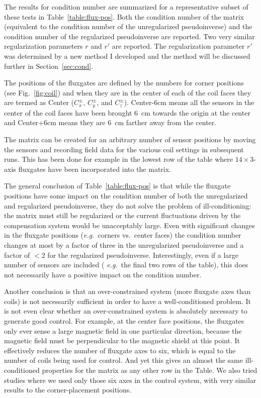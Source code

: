 The results for condition number are summarized for a representative
subset of these tests in Table~\ref{table:flux-pos}.  Both the
condition number of the matrix (equivalent to the condition number of
the unregularized pseudoinverse) and the condition number of the
regularized pseudoinverse are reported.  Two very similar
regularization parameters $r$ and $r'$ are reported.  The
regularization parameter $r'$ was determined by a new method I
developed and the method will be discussed further in
Section~\ref{sec:cond}.

The positions of the fluxgates are defined by the numbers for corner
positions (see Fig.~\ref{fig:coil}) and when they are in the center of
each of the coil faces they are termed as Center ($C_x^\pm$, $C_y^\pm$, and
$C_z^\pm$). Center-6cm means all the sensors in the center of the coil
faces have been brought 6~cm towards the origin at the center and
Center+6cm means they are 6~cm farther away from the center.

The matrix can be created for an arbitrary number of sensor positions
by moving the sensors and recording field data for the various coil
settings in subsequent runs.  This has been done for example in the
lowest row of the table where $14\times 3$-axis fluxgates have been
incorporated into the matrix.

The general conclusion of Table~\ref{table:flux-pos} is that while the
fluxgate positions have some impact on the condition number of both
the unregularized and regularized pseudoinverse, they do not solve the
problem of ill-conditioning: the matrix must still be regularized or
the current fluctuations driven by the compensation system would be
unacceptably large.  Even with significant changes in the fluxgate
positions ({\it e.g.}~corners vs.~center faces) the condition number
changes at most by a factor of three in the unregularized
pseudoinverse and a factor of $<2$ for the regularized pseudoinverse.
Interestingly, even if a large number of sensors are included ({\it
e.g.}~the final two rows of the table), this does not necessarily have
a positive impact on the condition number.

Another conclusion is that an over-constrained system (more fluxgate
axes than coils) is not necessarily sufficient in order to have a
well-conditioned problem.  It is not even clear whether an
over-constrained system is absolutely necessary to generate good
control.  For example, at the center face positions, the fluxgates
only ever sense a large magnetic field in one particular direction,
because the magnetic field must be perpendicular to the magnetic
shield at this point.  It effectively reduces the number of fluxgate
axes to six, which is equal to the number of coils being used for
control.  And yet this gives an almost the same ill-conditioned
properties for the matrix as any other row in the Table.  We also
tried studies where we used only those six axes in the control system,
with very similar results to the corner-placement positions.

